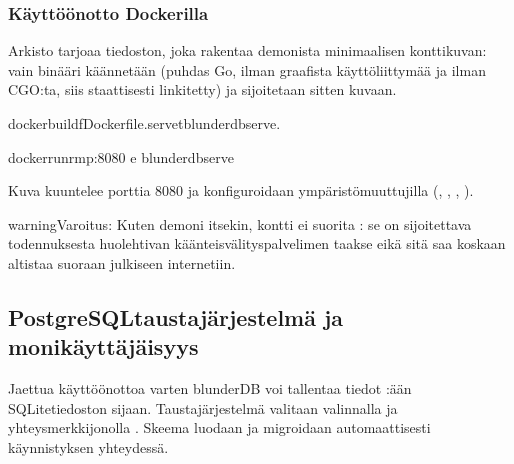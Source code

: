 \documentclass[letterpaper,10pt,finnish]{sphinxmanual}
\begin{document}
\subsubsection{Käyttöönotto Dockerilla}
\label{\detokenize{mode_headless:deploiement-avec-docker}}\label{\detokenize{mode_headless:headless-docker}}
\sphinxAtStartPar
Arkisto tarjoaa \sphinxhyphen{}tiedoston, joka rakentaa demonista minimaalisen konttikuvan: vain \sphinxhyphen{}binääri käännetään (puhdas Go, ilman graafista käyttöliittymää ja ilman CGO:ta, siis staattisesti linkitetty) ja sijoitetaan sitten \sphinxhyphen{}kuvaan.

\begin{sphinxVerbatim}[commandchars=\\\{\}]
dockerbuild\PYGZhy{}fDockerfile.serve\PYGZhy{}tblunderdb\PYGZhy{}serve.

dockerrun\PYGZhy{}\PYGZhy{}rm\PYGZhy{}p:8080
\PYGZhy{}e
blunderdb\PYGZhy{}serve
\end{sphinxVerbatim}

\sphinxAtStartPar
Kuva kuuntelee porttia 8080 ja konfiguroidaan ympäristömuuttujilla (, , , ).

\begin{sphinxadmonition}{warning}{Varoitus:}
\sphinxAtStartPar
Kuten demoni itsekin, kontti ei suorita : se on sijoitettava todennuksesta huolehtivan käänteisvälityspalvelimen taakse eikä sitä saa koskaan altistaa suoraan julkiseen internetiin.
\end{sphinxadmonition}


\subsection{PostgreSQL\sphinxhyphen{}taustajärjestelmä ja monikäyttäjäisyys}
\label{\detokenize{mode_headless:backend-postgresql-et-multi-utilisateurs}}\label{\detokenize{mode_headless:headless-postgres}}
\sphinxAtStartPar
Jaettua käyttöönottoa varten blunderDB voi tallentaa tiedot :ään SQLite\sphinxhyphen{}tiedoston sijaan. Taustajärjestelmä valitaan valinnalla  ja yhteysmerkkijonolla . Skeema luodaan ja migroidaan automaattisesti käynnistyksen yhteydessä.
\end{document}
